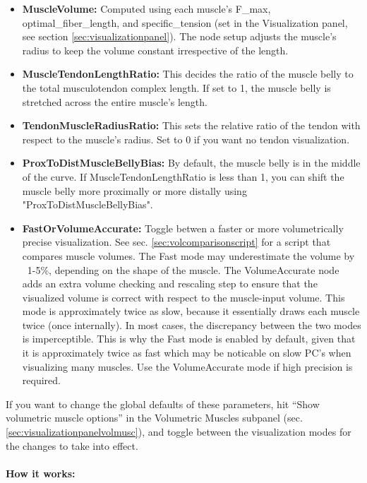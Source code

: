 \documentclass{article}
\begin{document}
\begin{itemize}
\item \textbf{MuscleVolume:} Computed using each muscle's F\_max, optimal\_fiber\_length, and specific\_tension (set in the Visualization panel, see section \ref{sec:visualizationpanel}). The node setup adjusts the muscle's radius to keep the volume constant irrespective of the length.
\item \textbf{MuscleTendonLengthRatio: } This decides the ratio of the muscle belly to the total musculotendon complex length. If set to 1, the muscle belly is stretched across the entire muscle's length. 
\item \textbf{TendonMuscleRadiusRatio: } This sets the relative ratio of the tendon with respect to the muscle's radius. Set to 0 if you want no tendon visualization.
\item \textbf{ProxToDistMuscleBellyBias: } By default, the muscle belly is in the middle of the curve. If MuscleTendonLengthRatio is less than 1, you can shift the muscle belly more proximally or more distally using "ProxToDistMuscleBellyBias".
\item \textbf{FastOrVolumeAccurate: } Toggle betwen a faster or more volumetrically precise visualization. See sec. \ref{sec:volcomparisonscript} for a script that compares muscle volumes. The Fast mode may underestimate the volume by ~1-5\%, depending on the shape of the muscle. The VolumeAccurate node adds an extra volume checking and rescaling step to ensure that the visualized volume is correct with respect to the muscle-input volume. This mode is approximately twice as slow, because it essentially draws each muscle twice (once internally). In most cases, the discrepancy between the two modes is imperceptible. This is why the Fast mode is enabled by default, given that it is approximately twice as fast which may be noticable on slow PC's when visualizing many muscles. Use the VolumeAccurate mode if high precision is required.
\end{itemize}

If you want to change the global defaults of these parameters, hit ``Show volumetric muscle options'' in the Volumetric Muscles subpanel (sec. \ref{sec:visualizationpanelvolmusc}), and toggle between the visualization modes for the changes to take into effect.


\paragraph{How it works:}
\end{document}
